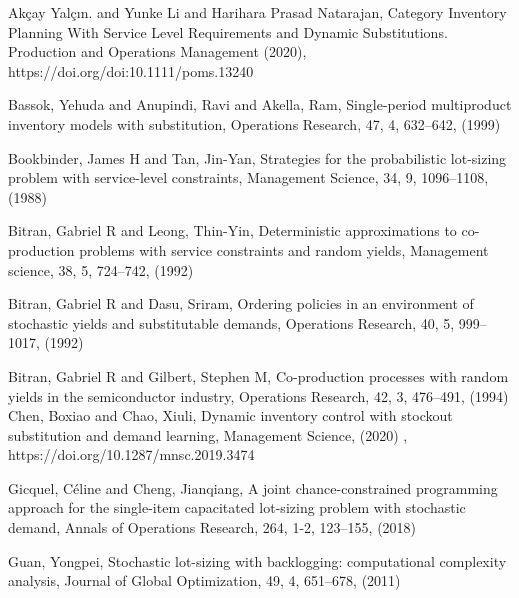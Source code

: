 \documentclass[11pt]{article}
\begin{document}
\begin{thebibliography}{99}







Akçay Yalçın. and Yunke Li and Harihara Prasad Natarajan, Category Inventory Planning With
Service Level Requirements and Dynamic Substitutions.
Production and Operations Management (2020), https://doi.org/doi:10.1111/poms.13240

Bassok, Yehuda and Anupindi, Ravi and Akella, Ram,
Single-period multiproduct inventory models with substitution, Operations Research, 47, 4, 632--642, (1999)
 

 Bookbinder, James H and Tan, Jin-Yan, Strategies for the probabilistic lot-sizing problem with service-level constraints, Management Science, 34, 9, 1096--1108,
 (1988)


Bitran, Gabriel R and Leong, Thin-Yin, Deterministic approximations to co-production problems with service constraints and random yields, Management science, 38, 5, 724--742, (1992)
  
  
Bitran, Gabriel R and Dasu, Sriram, Ordering policies in an environment of stochastic yields and substitutable demands,
Operations Research,
40, 5,
999--1017, (1992)

Bitran, Gabriel R and Gilbert, Stephen M,
  Co-production processes with random yields in the semiconductor industry, Operations Research, 42, 3, 476--491, (1994)
Chen, Boxiao and Chao, Xiuli, Dynamic inventory control with stockout substitution and demand learning, Management Science, (2020) , https://doi.org/10.1287/mnsc.2019.3474

Gicquel, C{\'e}line and Cheng, Jianqiang, A joint chance-constrained programming approach for the single-item capacitated lot-sizing problem with stochastic demand, Annals of Operations Research, 264, 1-2, 123--155, (2018)

 Guan, Yongpei, Stochastic lot-sizing with backlogging: computational complexity analysis,  Journal of Global Optimization, 49, 4, 651--678, (2011)


\end{thebibliography}
\end{document}

